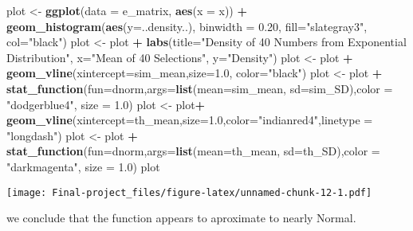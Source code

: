 \documentclass[]{article}
\newenvironment{Shaded}{\begin{snugshade}}{\end{snugshade}}
\newcommand{\KeywordTok}[1]{\textcolor[rgb]{0.13,0.29,0.53}{\textbf{#1}}}
\newcommand{\DataTypeTok}[1]{\textcolor[rgb]{0.13,0.29,0.53}{#1}}
\newcommand{\FloatTok}[1]{\textcolor[rgb]{0.00,0.00,0.81}{#1}}
\newcommand{\StringTok}[1]{\textcolor[rgb]{0.31,0.60,0.02}{#1}}
\newcommand{\OperatorTok}[1]{\textcolor[rgb]{0.81,0.36,0.00}{\textbf{#1}}}
\newcommand{\NormalTok}[1]{#1}
\begin{document}
\begin{Shaded}
\begin{Highlighting}[]
\NormalTok{plot <-}\StringTok{ }\KeywordTok{ggplot}\NormalTok{(}\DataTypeTok{data =}\NormalTok{ e_matrix, }\KeywordTok{aes}\NormalTok{(}\DataTypeTok{x =}\NormalTok{ x)) }\OperatorTok{+}\StringTok{ }
\StringTok{    }\KeywordTok{geom_histogram}\NormalTok{(}\KeywordTok{aes}\NormalTok{(}\DataTypeTok{y=}\NormalTok{..density..), }\DataTypeTok{binwidth =} \FloatTok{0.20}\NormalTok{, }\DataTypeTok{fill=}\StringTok{"slategray3"}\NormalTok{, }\DataTypeTok{col=}\StringTok{"black"}\NormalTok{)}
\NormalTok{plot <-}\StringTok{ }\NormalTok{plot }\OperatorTok{+}\StringTok{ }\KeywordTok{labs}\NormalTok{(}\DataTypeTok{title=}\StringTok{"Density of 40 Numbers from Exponential Distribution"}\NormalTok{, }\DataTypeTok{x=}\StringTok{"Mean of 40 Selections"}\NormalTok{, }\DataTypeTok{y=}\StringTok{"Density"}\NormalTok{)}
\NormalTok{plot <-}\StringTok{ }\NormalTok{plot }\OperatorTok{+}\StringTok{ }\KeywordTok{geom_vline}\NormalTok{(}\DataTypeTok{xintercept=}\NormalTok{sim_mean,}\DataTypeTok{size=}\FloatTok{1.0}\NormalTok{, }\DataTypeTok{color=}\StringTok{"black"}\NormalTok{)}
\NormalTok{plot <-}\StringTok{ }\NormalTok{plot }\OperatorTok{+}\StringTok{ }\KeywordTok{stat_function}\NormalTok{(}\DataTypeTok{fun=}\NormalTok{dnorm,}\DataTypeTok{args=}\KeywordTok{list}\NormalTok{(}\DataTypeTok{mean=}\NormalTok{sim_mean, }\DataTypeTok{sd=}\NormalTok{sim_SD),}\DataTypeTok{color =} \StringTok{"dodgerblue4"}\NormalTok{, }\DataTypeTok{size =} \FloatTok{1.0}\NormalTok{)}
\NormalTok{plot <-}\StringTok{ }\NormalTok{plot}\OperatorTok{+}\StringTok{ }\KeywordTok{geom_vline}\NormalTok{(}\DataTypeTok{xintercept=}\NormalTok{th_mean,}\DataTypeTok{size=}\FloatTok{1.0}\NormalTok{,}\DataTypeTok{color=}\StringTok{"indianred4"}\NormalTok{,}\DataTypeTok{linetype =} \StringTok{"longdash"}\NormalTok{)}
\NormalTok{plot <-}\StringTok{ }\NormalTok{plot }\OperatorTok{+}\StringTok{ }\KeywordTok{stat_function}\NormalTok{(}\DataTypeTok{fun=}\NormalTok{dnorm,}\DataTypeTok{args=}\KeywordTok{list}\NormalTok{(}\DataTypeTok{mean=}\NormalTok{th_mean, }\DataTypeTok{sd=}\NormalTok{th_SD),}\DataTypeTok{color =} \StringTok{"darkmagenta"}\NormalTok{, }\DataTypeTok{size =} \FloatTok{1.0}\NormalTok{)}
\NormalTok{plot}
\end{Highlighting}
\end{Shaded}

\texttt{[image: Final-project\_files/figure-latex/unnamed-chunk-12-1.pdf]}

we conclude that the function appears to aproximate to nearly Normal.
\end{document}
